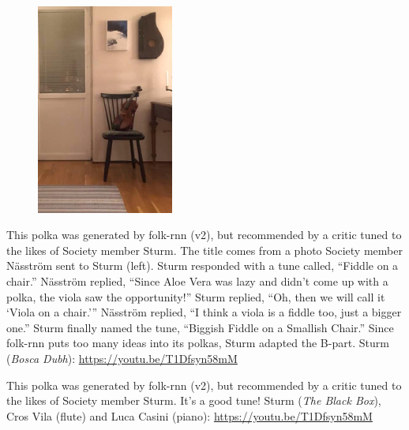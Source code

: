 \documentclass[a4paper,notitlepage,twoside]{book}
\begin{document}
{}  
  
\hypertarget{polka:BiggishFiddle}{}
\begin{figure}
\includegraphics[width=0.4\textwidth]{BiggishFiddle.jpg}
\end{figure}
This polka was generated by folk-rnn (v2), but recommended by
a critic tuned to the likes of Society member Sturm.
The title comes from a photo Society member Näsström sent to Sturm (left).
Sturm responded with a tune called, ``Fiddle on a chair.''
Näsström replied, ``Since Aloe Vera was lazy and didn’t come up with a polka, 
the viola saw the opportunity!''
Sturm replied, ``Oh, then we will call it `Viola on a chair.'''
Näsström replied, ``I think a viola is a fiddle too, just a bigger one.''
Sturm finally named the tune, ``Biggish Fiddle on a Smallish Chair.''
Since folk-rnn puts too many ideas into its polkas, 
Sturm adapted the B-part.
Sturm ({\em Bosca Dubh}): \url{https://youtu.be/T1Dfsyn58mM}

\clearpage
{}
{}  
  
\hypertarget{polka:PolkaandRoll}{}
This polka was generated by folk-rnn (v2), but recommended by
a critic tuned to the likes of Society member Sturm.
It's a good tune!
Sturm ({\em The Black Box}), Cros Vila (flute) and Luca Casini (piano): \url{https://youtu.be/T1Dfsyn58mM}

\clearpage
\end{document}
